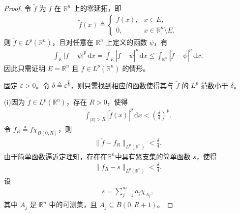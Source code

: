 \documentclass[../../main.tex]{subfiles}%
\begin{document}
\begin{proof}

令 \(\widetilde f\) 为 \(f\) 在 \(\mathbb{R}^n\) 上的零延拓，即
\begin{align*}
\widetilde f(x)\triangleq
\begin{cases}
f(x), & x\in E,\\
0, & x\in\mathbb{R}^n\setminus E.
\end{cases}
\end{align*}
则 \(\widetilde f\in L^p(\mathbb{R}^n)\)，且对任意在 \(\mathbb{R}^n\) 上定义的函数 \(\psi\)，有
\begin{align*}
\int_E |f-\psi|^p\,\mathrm{d}x
=\int_E |\widetilde f-\psi|^p\,\mathrm{d}x
\leqslant\int_{\mathbb{R}^n} |\widetilde f-\psi|^p\,\mathrm{d}x.
\end{align*}
因此只需证明 \(E=\mathbb{R}^n\) 且 \(f\in L^p(\mathbb{R}^n)\) 的情形。

固定 \(\varepsilon>0\)。令 \(\delta\triangleq\varepsilon^{\frac{1}{p}}\)，则只需找到相应的函数使得其与 \(\widetilde f\) 的 \(L^p\) 范数小于 \(\delta\)。

(i)因为 \(\widetilde f\in L^p(\mathbb{R}^n)\)，存在 \(R>0\)，使得
\begin{align*}
\int_{|x|>R}|\widetilde f(x)|^p\,\mathrm{d}x<\left(\frac{\delta}{4}\right)^p.
\end{align*}
令 \(f_R\triangleq\widetilde f\chi_{B(0,R)}\)，则
\begin{align*}
\|\widetilde f-f_R\|_{L^p(\mathbb{R}^n)}<\frac{\delta}{4}.
\end{align*}
由于\hyperref[theorem:简单函数逼近定理]{简单函数逼近定理}知，存在在$\mathbb{R}^n$中具有紧支集的简单函数 \(s\)，使得
\begin{align*}
\|f_R-s\|_{L^p(\mathbb{R}^n)}<\frac{\delta}{4}.
\end{align*}
设
\begin{align*}
s=\sum_{j=1}^m a_j\chi_{A_j},
\end{align*}
其中 \(A_j\) 是 \(\mathbb{R}^n\) 中的可测集，且 \(A_j\subseteq B(0,R+1)\)。


\end{proof}
\end{document}
